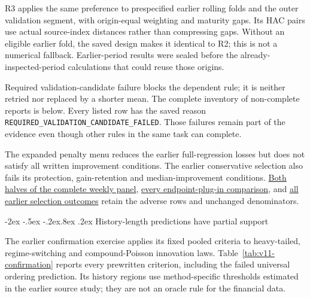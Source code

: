 \documentclass[10pt,a4paper]{article}
\makeatletter
\renewcommand\section{\@startsection{section}{1}{\z@}%
  {-2ex \@plus -.5ex \@minus -.2ex}{.8ex \@plus .2ex}%
  {\normalfont\large\bfseries}}
\makeatother
\begin{document}
R3 applies the same preference to prespecified earlier rolling folds and the
outer validation segment, with origin-equal weighting and maturity gaps.
Its HAC pairs use actual source-index distances rather than compressing gaps.
Without an eligible earlier fold, the saved design makes it identical to R2;
this is not a numerical fallback. Earlier-period results were sealed before
the already-inspected-period calculations that could reuse those origins.

Required validation-candidate failure blocks the dependent rule;
it is neither retried nor replaced by a shorter mean. The complete inventory of non-complete reports is below. Every listed row has the saved reason
\texttt{REQUIRED\_VALIDATION\_CANDIDATE\_FAILED}. Those failures remain part of
the evidence even though other rules in the same task can complete.

The expanded penalty menu reduces the earlier full-regression losses but does not satisfy all written improvement conditions. The earlier conservative selection also fails its protection, gain-retention and median-improvement conditions. \href{https://github.com/ByronLi0207/financial-mathematics-paper-20261020/blob/submission-final/EXTENDED_RESULTS.md#asmbi-extended-s11}{Both halves of the complete weekly panel}, \href{https://github.com/ByronLi0207/financial-mathematics-paper-20261020/blob/submission-final/EXTENDED_RESULTS.md#asmbi-extended-s13}{every endpoint-plug-in comparison}, and \href{https://github.com/ByronLi0207/financial-mathematics-paper-20261020/blob/submission-final/EXTENDED_RESULTS.md#asmbi-extended-s14}{all earlier selection outcomes} retain the adverse rows and unchanged denominators.

\FloatBarrier


\section{History-length predictions have partial support}\label{sup:v11-history}\label{sup:submission-wp2}

The earlier confirmation exercise applies its fixed pooled criteria to heavy-tailed, regime-switching and compound-Poisson innovation laws. Table~\ref{tab:v11-confirmation} reports every prewritten criterion, including the failed universal ordering prediction. Its history regions use method-specific thresholds estimated in the earlier source study; they are not an oracle rule for the financial data.
\end{document}
